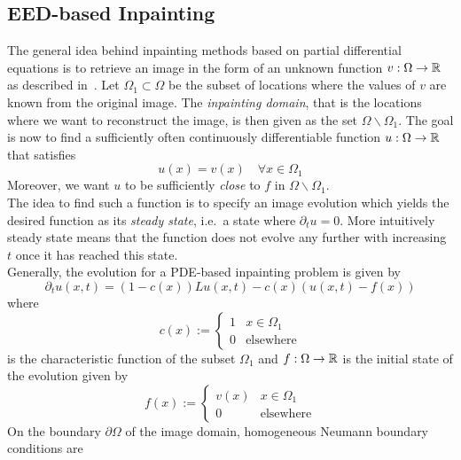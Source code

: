 \subsection{EED-based Inpainting}\label{sub:EEDInpaint}
The general idea behind inpainting methods based on partial differential equations  is to
retrieve an image in the form of an unknown function $v: \Omega \rightarrow \mathbb{R}$ as described 
in~\cite{galic05}. Let $\Omega_1\subset\Omega$ be the subset of locations where the values 
of $v$ are known from the original image. The \textit{inpainting domain}, that is the locations 
where we want to reconstruct the image, is then given as the set $\Omega\backslash\Omega_1$. 
The goal is now to find a sufficiently often continuously differentiable function
$u:\Omega\rightarrow\mathbb{R}$ that satisfies
\begin{equation}
    u(x) = v(x)\quad\forall x\in\Omega_1
\end{equation}
Moreover, we want $u$ to be sufficiently \textit{close} to $f$ in $\Omega\backslash\Omega_1$.\\
The idea to find such a function is to specify an image evolution which yields the desired
function as its \textit{steady state}, i.e.\ a state where $\partial_{t}u = 0$. More intuitively 
steady state means that the function does not evolve any further with increasing $t$ once it has
reached this state.\\
Generally, the evolution for a PDE-based inpainting problem is given by
\begin{equation}
    \partial_t u(x,t) = (1-c(x))Lu(x,t) - c(x) (u(x, t) - f(x))\label{eq:Evolution}
\end{equation}
where 
\begin{equation} 
    c(x) := \begin{cases}
        1&x\in\Omega_1\\
        0&\text{elsewhere}
    \end{cases} 
\end{equation}
is the characteristic function of the subset $\Omega_1$ and $f:\Omega\rightarrow\mathbb{R}$ is the
initial state of the evolution given by
\begin{equation} 
    f(x) := \begin{cases}
        v(x)&x\in\Omega_1\\
        0&\text{elsewhere}
    \end{cases} 
\end{equation}
\newpage\noindent
On the boundary $\partial\Omega$ of the image domain, homogeneous Neumann boundary conditions are
